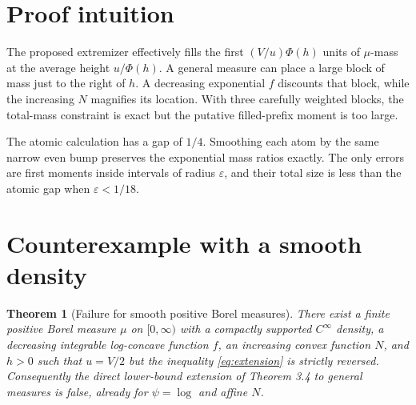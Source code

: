 \documentclass[11pt]{article}
\newtheorem{theorem}{Theorem}
\begin{document}
\section{Proof intuition}

The proposed extremizer effectively fills the first $(V/u)\Phi(h)$ units of
$\mu$-mass at the average height $u/\Phi(h)$.  A general measure can place a
large block of mass just to the right of $h$.  A decreasing exponential $f$
discounts that block, while the increasing $N$ magnifies its location.  With
three carefully weighted blocks, the total-mass constraint is exact but the
putative filled-prefix moment is too large.

The atomic calculation has a gap of $1/4$.  Smoothing each atom by the same
narrow even bump preserves the exponential mass ratios exactly.  The only
errors are first moments inside intervals of radius $\varepsilon$, and their
total size is less than the atomic gap when $\varepsilon<1/18$.

\section{Counterexample with a smooth density}

\begin{theorem}[Failure for smooth positive Borel measures]\label{thm:main}
There exist a finite positive Borel measure $\mu$ on $[0,\infty)$ with a
compactly supported $C^\infty$ density, a decreasing integrable log-concave
function $f$, an increasing convex function $N$, and $h>0$ such that
$u=V/2$ but the inequality \eqref{eq:extension} is strictly reversed.
Consequently the direct lower-bound extension of Theorem 3.4 to general
measures is false, already for $\psi=\log$ and affine $N$.
\end{theorem}
\end{document}
